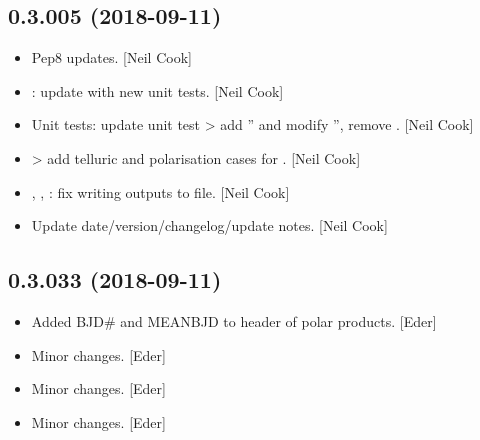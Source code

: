 \documentclass[a4paper,10pt,english]{report}
\begin{document}
\subsection{0.3.005 (2018-09-11)}
\label{\detokenize{misc/changelog:id328}}\begin{itemize}
\item {} 
Pep8 updates. {[}Neil Cook{]}

\item {} 
: update with new unit tests. {[}Neil Cook{]}

\item {} 
Unit tests: update unit test \textendash{}\textgreater{} add ” and modify
”, remove . {[}Neil Cook{]}

\item {} 
 \textendash{}\textgreater{} add telluric and polarisation cases for
. {[}Neil Cook{]}

\item {} 
, , : fix writing outputs
to file. {[}Neil Cook{]}

\item {} 
Update date/version/changelog/update notes. {[}Neil Cook{]}

\end{itemize}


\subsection{0.3.033 (2018-09-11)}
\label{\detokenize{misc/changelog:id329}}\begin{itemize}
\item {} 
Added BJD\# and MEANBJD to header of polar products. {[}Eder{]}

\item {} 
Minor changes. {[}Eder{]}

\item {} 
Minor changes. {[}Eder{]}

\item {} 
Minor changes. {[}Eder{]}

\end{itemize}
\end{document}
